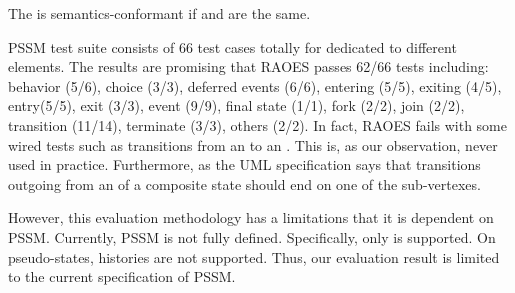 The  is semantics-conformant if  and  are the same.




PSSM test suite consists of 66 test cases totally for dedicated to different elements.
The results are promising that RAOES passes 62/66 tests including: behavior (5/6), choice (3/3), deferred events (6/6), entering (5/5), exiting (4/5), entry(5/5), exit (3/3), event (9/9), final state (1/1), fork (2/2), join (2/2), transition (11/14), terminate (3/3), others (2/2).  
In fact, RAOES fails with some wired tests such as transitions from an  to an . 
This is, as our observation, never used in practice. 
Furthermore, as the UML specification says that transitions outgoing from an  of a composite state should end on one of the sub-vertexes.

However, this evaluation methodology has a limitations that it is dependent on PSSM.
Currently, PSSM is not fully defined.
Specifically, only  is supported.
On pseudo-states, histories are not supported.
Thus, our evaluation result is limited to the current specification of PSSM.

